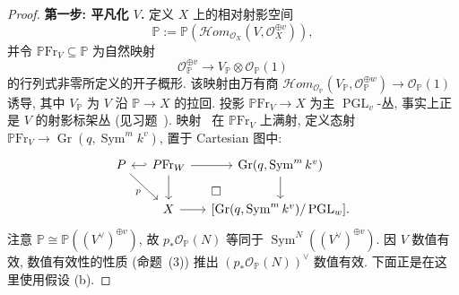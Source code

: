 \begin{proof}
\textbf{第一步: 平凡化 $V$.} 定义 $X$ 上的相对射影空间
\[
\mathbb P:=\mathbb P(\mathcal Hom_{\mathcal O_X}(V,\mathcal O_X^{\oplus v})),
\]
并令 $\mathbb P\mathrm{Fr}_V\subseteq\mathbb P$ 为自然映射
\begin{equation}\label{src:6.9.16}
\mathcal O_{\mathbb P}^{\oplus v}\longrightarrow V_{\mathbb P}\otimes\mathcal O_{\mathbb P}(1)
\end{equation}
的行列式非零所定义的开子概形. 该映射由万有商 $\mathcal Hom_{\mathcal O_{\mathbb P}}(V_{\mathbb P},\allowbreak \mathcal O_{\mathbb P}^{\oplus w})\to\mathcal O_{\mathbb P}(1)$ 诱导, 其中 $V_{\mathbb P}$ 为 $V$ 沿 $\mathbb P\to\allowbreak X$ 的拉回. 投影 $\mathbb P\mathrm{Fr}_V\to\allowbreak X$ 为主 $\operatorname{PGL}_v$-丛, 事实上正是 $V$ 的射影标架丛 (见习题~). 映射~ 在 $\mathbb P\mathrm{Fr}_V$ 上满射, 定义态射 $\mathbb P\mathrm{Fr}_V\to\operatorname{Gr}(q,\allowbreak \operatorname{Sym}^mk^v)$, 置于 Cartesian 图中:
\[
\begin{tikzcd}[column sep=small]
\mathbb P\arrow[dr,"p"']&\mathbb P\mathrm{Fr}_W\arrow[l,hook']\arrow[r]\arrow[d]&\operatorname{Gr}(q,\operatorname{Sym}^mk^v)\arrow[d]\\
&X\arrow[r]\arrow[ur,phantom,"\square" description]&{[\operatorname{Gr}(q,\operatorname{Sym}^mk^v)/\operatorname{PGL}_w]}.
\end{tikzcd}
\]
注意 $\mathbb P\cong\mathbb P((V^\vee)^{\oplus v})$, 故 $p_*\mathcal O_{\mathbb P}(N)$ 等同于 $\operatorname{Sym}^N((V^\vee)^{\oplus v})$. 因 $V$ 数值有效, 数值有效性的性质 (命题~(3)) 推出 $(p_*\mathcal O_{\mathbb P}(N))^\vee$ 数值有效. 下面正是在这里使用假设 (b).


\end{proof}

